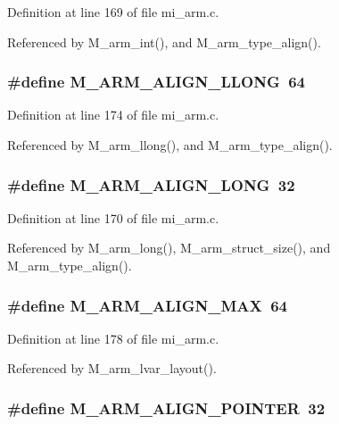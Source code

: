 Definition at line 169 of file mi\_\-arm.c.

Referenced by M\_\-arm\_\-int(), and M\_\-arm\_\-type\_\-align().
\subsubsection{\setlength{\rightskip}{0pt plus 5cm}\#define M\_\-ARM\_\-ALIGN\_\-LLONG~64}\label{mi__arm_8c_5934bfaef80b0ec1874ff22c638754e1}




Definition at line 174 of file mi\_\-arm.c.

Referenced by M\_\-arm\_\-llong(), and M\_\-arm\_\-type\_\-align().
\subsubsection{\setlength{\rightskip}{0pt plus 5cm}\#define M\_\-ARM\_\-ALIGN\_\-LONG~32}\label{mi__arm_8c_08694e5b82820b7636cd7794d482dba3}




Definition at line 170 of file mi\_\-arm.c.

Referenced by M\_\-arm\_\-long(), M\_\-arm\_\-struct\_\-size(), and M\_\-arm\_\-type\_\-align().
\subsubsection{\setlength{\rightskip}{0pt plus 5cm}\#define M\_\-ARM\_\-ALIGN\_\-MAX~64}\label{mi__arm_8c_ad3fe00f7e378162143b82dce60a4ffd}




Definition at line 178 of file mi\_\-arm.c.

Referenced by M\_\-arm\_\-lvar\_\-layout().
\subsubsection{\setlength{\rightskip}{0pt plus 5cm}\#define M\_\-ARM\_\-ALIGN\_\-POINTER~32}\label{mi__arm_8c_87acac46f1547b8b362405566709a1e0}




